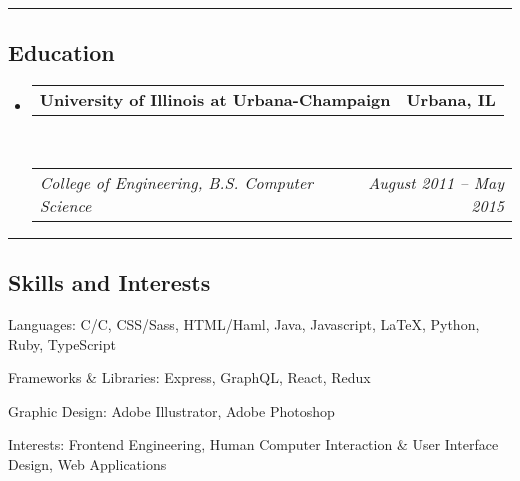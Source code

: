 \documentclass[10pt,letterpaper]{article}
\makeatletter
\newcommand{\headerrow}[2]
{\begin{tabular*}{\linewidth}{l@{\extracolsep{\fill}}r}
	#1 &
	#2 \\
\end{tabular*}}
\newcommand{\CPP}
{C\nolinebreak[4]\hspace{-.05em}\raisebox{.22ex}{\footnotesize\bf ++}}
\makeatother
\begin{document}
\hrule
\vspace{-0.4em}
\subsection*{Education}

\begin{itemize}
	\parskip=0.1em

	\item
	\headerrow
		{\textbf{University of Illinois at Urbana-Champaign}}
		{\textbf{Urbana, IL}}
	\\
	\headerrow
		{\emph{College of Engineering, B.S. Computer Science}}
		{\emph{August 2011 -- May 2015}}

\end{itemize}


\hrule
\vspace{-0.4em}
\subsection*{Skills and Interests}

\begin{description*}
	\item[Languages:]
       C/\CPP, CSS/Sass, HTML/Haml, Java, Javascript, \LaTeX, Python, 
       Ruby, TypeScript
	\item[Frameworks \& Libraries:]
	Express, GraphQL, React, Redux
	\item[Graphic Design:]
	Adobe Illustrator, Adobe Photoshop
	\item[Interests:]
	Frontend Engineering, Human Computer Interaction \& User Interface Design, Web
	Applications
\end{description*}
\end{document}
